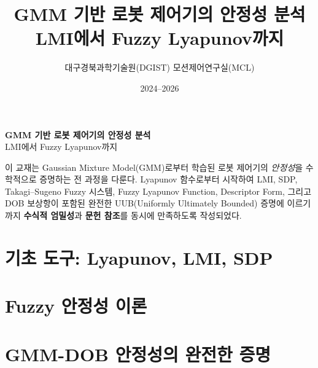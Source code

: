 \documentclass[11pt,a4paper,openright]{book}
\title{\LARGE GMM 기반 로봇 제어기의 안정성 분석\\[4pt]
  \Large LMI에서 Fuzzy Lyapunov까지}
\author{대구경북과학기술원(DGIST) 모션제어연구실(MCL)}
\date{2024--2026}
\theoremstyle{definition}
\begin{document}
\frontmatter
\maketitle

\begin{center}
\vspace*{2cm}
\begin{minipage}{0.85\textwidth}
\begin{center}
\large
\textbf{GMM 기반 로봇 제어기의 안정성 분석}\\[2pt]
\normalsize LMI에서 Fuzzy Lyapunov까지
\end{center}
\vspace{1cm}
\small
이 교재는 Gaussian Mixture Model(GMM)로부터 학습된 로봇 제어기의
\emph{안정성}을 수학적으로 증명하는 전 과정을 다룬다.
Lyapunov 함수로부터 시작하여 LMI, SDP, Takagi--Sugeno Fuzzy 시스템,
Fuzzy Lyapunov Function, Descriptor Form, 그리고 DOB 보상항이 포함된
완전한 UUB(Uniformly Ultimately Bounded) 증명에 이르기까지
\textbf{수식적 엄밀성}과 \textbf{문헌 참조}를 동시에 만족하도록 작성되었다.
\end{minipage}
\end{center}

\tableofcontents

\mainmatter

\part{기초 도구: Lyapunov, LMI, SDP}





\part{Fuzzy 안정성 이론}





\part{GMM-DOB 안정성의 완전한 증명}






\backmatter
\end{document}
